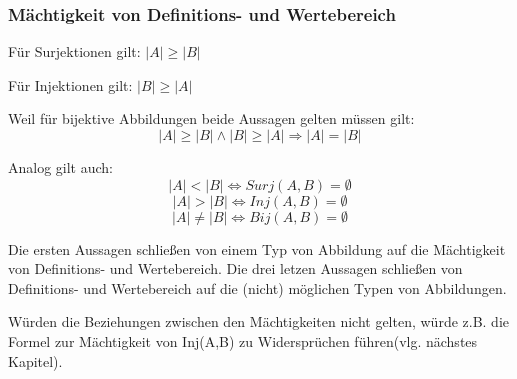 \begin{figure}
\hfill
{}\hfill
{}\hfill
{}
\end{figure}

\subsubsection{Mächtigkeit von Definitions- und Wertebereich}

Für Surjektionen gilt: $|A| \geq |B|$

Für Injektionen gilt: $|B| \geq |A|$

Weil für bijektive Abbildungen beide Aussagen gelten müssen gilt:
$$|A| \geq |B| \wedge |B| \geq |A| \Rightarrow |A| = |B| $$


Analog gilt auch:
$$ |A|<|B| \Longleftrightarrow Surj(A,B) = \emptyset $$
$$ |A|>|B| \Longleftrightarrow Inj(A,B) = \emptyset $$
$$ |A| \neq |B| \Longleftrightarrow Bij(A,B) = \emptyset $$

Die ersten Aussagen schließen von einem Typ von Abbildung auf die Mächtigkeit von Definitions- und Wertebereich.
Die drei letzen Aussagen schließen von Definitions- und Wertebereich auf die (nicht) möglichen Typen von Abbildungen.

Würden die Beziehungen zwischen den Mächtigkeiten nicht gelten, würde z.B. die Formel zur Mächtigkeit von Inj(A,B) zu Widersprüchen führen(vlg. nächstes Kapitel).